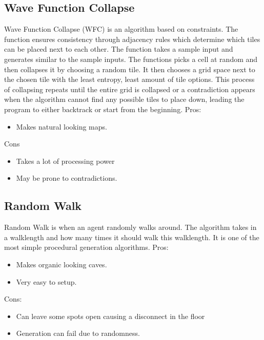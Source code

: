 \documentclass{article}
\begin{document}
\subsection*{Wave Function Collapse}
Wave Function Collapse (WFC) is an algorithm based on constraints. The function ensures consistency
through adjacency rules which determine which tiles can be placed next to each other. The 
function takes a sample input and generates similar to the sample inputs. The functions
picks a cell at random and then collapses it by choosing a random tile. It then chooses
a grid space next to the chosen tile with the least entropy, least amount of tile options.
This process of collapsing repeats until the entire grid is collapsed or a contradiction 
appears when the algorithm cannot find any possible tiles to place down, leading the program
to either backtrack or start from the beginning.
Pros:
\begin{itemize}
    \item Makes natural looking maps.
\end{itemize}
Cons
\begin{itemize}
    \item Takes a lot of processing power
    \item May be prone to contradictions.
\end{itemize}

\subsection*{Random Walk}
Random Walk is when an agent randomly walks around. The algorithm takes in a walklength and how many times
it should walk this walklength. It is one of the most simple procedural generation algorithms.
Pros:
\begin{itemize}
    \item Makes organic looking caves.
    \item Very easy to setup.
\end{itemize}
Cons:
\begin{itemize}
    \item Can leave some spots open causing a disconnect in the floor
    \item Generation can fail due to randomness.
\end{itemize}
\end{document}
